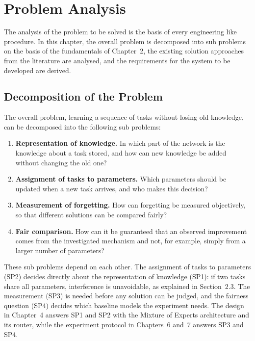 \chapter{Problem Analysis}
\label{chap:analysis}

The analysis of the problem to be solved is the basis of every engineering
like procedure. In this chapter, the overall problem is decomposed into sub
problems on the basis of the fundamentals of Chapter~2, the existing
solution approaches from the literature are analysed, and the requirements
for the system to be developed are derived.

\section{Decomposition of the Problem}
\label{sec:decomposition}

The overall problem, learning a sequence of tasks without losing old
knowledge, can be decomposed into the following sub problems:

\begin{enumerate}[label=\textbf{SP\arabic*.}, leftmargin=3em]
  \item \textbf{Representation of knowledge.} In which part of the network
        is the knowledge about a task stored, and how can new knowledge be
        added without changing the old one?
  \item \textbf{Assignment of tasks to parameters.} Which parameters should
        be updated when a new task arrives, and who makes this decision?
  \item \textbf{Measurement of forgetting.} How can forgetting be measured
        objectively, so that different solutions can be compared fairly?
  \item \textbf{Fair comparison.} How can it be guaranteed that an observed
        improvement comes from the investigated mechanism and not, for
        example, simply from a larger number of parameters?
\end{enumerate}

These sub problems depend on each other. The assignment of tasks to
parameters (SP2) decides directly about the representation of knowledge
(SP1): if two tasks share all parameters, interference is unavoidable, as
explained in Section~2.3. The measurement (SP3) is needed before any
solution can be judged, and the fairness question (SP4) decides which
baseline models the experiment needs. The design in Chapter~4 answers SP1
and SP2 with the Mixture of Experts architecture and its router, while the
experiment protocol in Chapters~6 and~7 answers SP3 and SP4.

